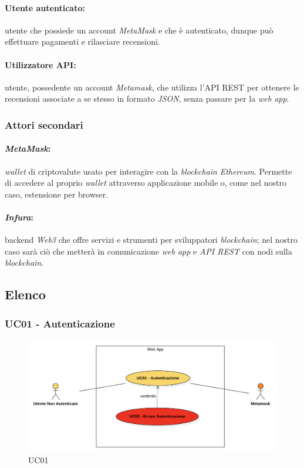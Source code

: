             \paragraph*{Utente autenticato:} utente che possiede un account \textit{MetaMask} e che è autenticato, dunque può effettuare pagamenti e rilasciare recensioni.

            \paragraph*{Utilizzatore API:} utente, possedente un account \textit{Metamask}, che utilizza l'API REST per ottenere le recensioni associate a se stesso in formato \textit{JSON}\glo, senza passare per la \textit{web app}.

        \subsubsection{Attori secondari}
            \paragraph*{\textit{MetaMask}:} \textit{wallet}\glo\: di criptovalute usato per interagire con la \textit{blockchain} \textit{Ethereum}. Permette di accedere al proprio \textit{wallet} attraverso applicazione mobile o, come nel nostro caso, estensione per browser.

            \paragraph*{\textit{Infura}\glo:} backend \textit{Web3}\glo\: che offre servizi e strumenti per sviluppatori \textit{blockchain}; nel nostro caso sarà ciò che metterà in comunicazione \textit{web app} e \textit{API REST} con nodi\glo\: sulla \textit{blockchain}.

    \subsection{Elenco}

        \subsubsection{UC01 - Autenticazione}
        \label{UC01}

            \begin{figure}[H]
                \centering
                \includegraphics[scale=0.6]{src/img/UC01.png}
                \caption{UC01}
            \end{figure}

